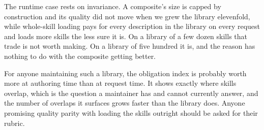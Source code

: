 \documentclass[11pt]{article}
\begin{document}
The runtime case rests on invariance. A composite's size is capped by construction and its quality
did not move when we grew the library elevenfold, while whole-skill loading pays for every
description in the library on every request and loads more skills the less sure it is. On a library
of a few dozen skills that trade is not worth making. On a library of five hundred it is, and the
reason has nothing to do with the composite getting better.

For anyone maintaining such a library, the obligation index is probably worth more at authoring time
than at request time. It shows exactly where skills overlap, which is the question a maintainer has
and cannot currently answer, and the number of overlaps it surfaces grows faster than the library
does. Anyone promising quality parity with loading the skills outright should be asked for their
rubric.
\end{document}
